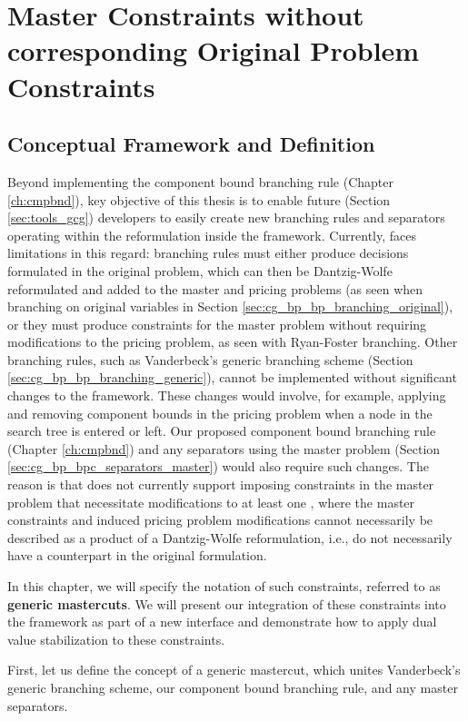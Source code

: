 \chapter{Master Constraints without corresponding Original Problem Constraints}\label{ch:gm}
\section{Conceptual Framework and Definition}\label{sec:gm}
Beyond implementing the component bound branching rule (Chapter \ref{ch:cmpbnd}), key objective of this thesis is to enable future \GCG{} (Section \ref{sec:tools_gcg}) developers to easily create new branching rules and separators operating within the reformulation inside the framework. Currently, \GCG{} faces limitations in this regard: branching rules must either produce decisions formulated in the original problem, which can then be Dantzig-Wolfe reformulated and added to the master and pricing problems (as seen when branching on original variables in Section \ref{sec:cg_bp_bp_branching_original}), or they must produce constraints for the master problem without requiring modifications to the pricing problem, as seen with Ryan-Foster branching. Other branching rules, such as Vanderbeck's generic branching scheme (Section \ref{sec:cg_bp_bp_branching_generic}), cannot be implemented without significant changes to the \GCG{} framework. These changes would involve, for example, applying and removing component bounds in the pricing problem when a node in the search tree is entered or left. Our proposed component bound branching rule (Chapter \ref{ch:cmpbnd}) and any separators using the master problem (Section \ref{sec:cg_bp_bpc_separators_master}) would also require such changes. The reason is that \GCG{} does not currently support imposing constraints in the master problem that necessitate modifications to at least one \SP{}, where the master constraints and induced pricing problem modifications cannot necessarily be described as a product of a Dantzig-Wolfe reformulation, i.e., do not necessarily have a counterpart in the original formulation.

In this chapter, we will specify the notation of such constraints, referred to as \textbf{generic mastercuts}. We will present our integration of these constraints into the \GCG{} framework as part of a new interface and demonstrate how to apply dual value stabilization to these constraints.

First, let us define the concept of a generic mastercut, which unites Vanderbeck's generic branching scheme, our component bound branching rule, and any master separators.

